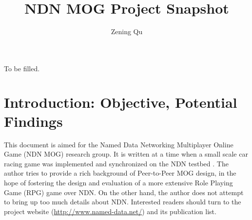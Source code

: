 \documentclass{article}
\begin{document}
\title{NDN MOG Project Snapshot}
\author{Zening Qu}
\maketitle

\abstract
To be filled.

\tableofcontents
\listoffigures
\listoftables
\newpage

\section{Introduction: Objective, Potential Findings}
\label{itro}


This document is aimed for the Named Data Networking Multiplayer Online Game (NDN MOG) research group. It is written at a time when a small scale car racing game was implemented and synchronized on the NDN testbed \cite{egalcar}. The author tries to provide a rich background of Peer-to-Peer MOG design, in the hope of fostering the design and evaluation of a more extensive Role Playing Game (RPG) game over NDN. On the other hand, the author does not attempt to bring up too much details about NDN. Interested readers should turn to the project website (\href{http://www.named-data.net/}{http://www.named-data.net/}) and its publication list.
\end{document}
